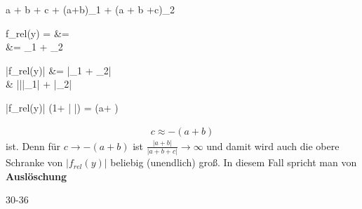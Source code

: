 \documentclass[13pt]{scrreprt}
\begin{document}
\begin{abox}
	 \overset{\cdot}{=}  a + b + c + (a+b)\cdot\epsilon_1 + (a + b +c)\cdot\epsilon_2
\end{abox}

\begin{abox}
	f_{rel}(y) =  &= \\
	&= \cdot\epsilon_1 + \epsilon_2
\end{abox}

\begin{abox}
	|f_{rel}(y)| &= |\cdot\epsilon_1 + \epsilon_2|\\ & ||\cdot|\epsilon_1| + |\epsilon_2|
\end{abox}

\begin{abox}
	|f_{rel}(y)| \leqslant (1+ | |) \cdot \epsilon = (a+ ) \cdot \epsilon
\end{abox}

\begin{tbox}
	\begin{align*}
	c \approx -(a+b)
	\end{align*}
	ist. Denn für $c \rightarrow -(a+b)$ ist $ \frac{|a+b|}{|a+b+c|} \rightarrow \infty$ und damit wird auch die obere Schranke von $|f_{rel}(y)|$ beliebig (unendlich) groß. In diesem Fall spricht man von \textbf{Auslöschung}
\end{tbox}


30-36
\end{document}
